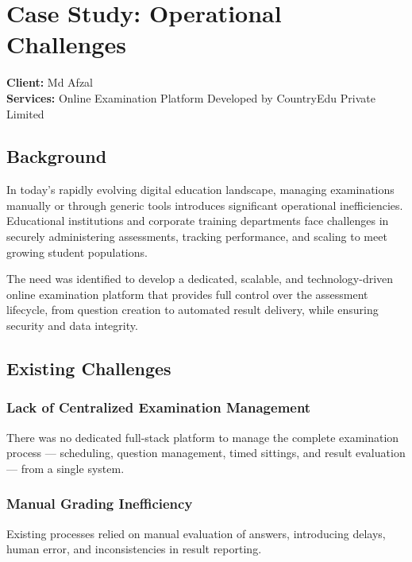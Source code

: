 \documentclass[12pt,a4paper]{article}
\begin{document}
\newpage


\section{Case Study: Operational Challenges}

\textbf{Client:} Md Afzal\\
\textbf{Services:} Online Examination Platform Developed by CountryEdu Private Limited

\subsection{Background}

In today's rapidly evolving digital education landscape, managing examinations manually or through generic tools introduces significant operational inefficiencies. Educational institutions and corporate training departments face challenges in securely administering assessments, tracking performance, and scaling to meet growing student populations.

The need was identified to develop a dedicated, scalable, and technology-driven online examination platform that provides full control over the assessment lifecycle, from question creation to automated result delivery, while ensuring security and data integrity.

\subsection{Existing Challenges}

\subsubsection{Lack of Centralized Examination Management}
There was no dedicated full-stack platform to manage the complete examination process — scheduling, question management, timed sittings, and result evaluation — from a single system.

\subsubsection{Manual Grading Inefficiency}
Existing processes relied on manual evaluation of answers, introducing delays, human error, and inconsistencies in result reporting.
\end{document}
